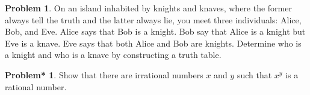 \documentclass[12pt,english]{amsart}
\theoremstyle{plain}
\theoremstyle{definition}
\theoremstyle{plain}
\theoremstyle{plain}
\theoremstyle{remark}
\newcounter{problems}
\theoremstyle{definition}
\newtheorem{problem}[problems]{Problem}
\newtheorem{bproblem}[problems]{ Problem*}
\theoremstyle{remark}
\newtheorem*{solution}{Solution}
\begin{document}
\begin{problem}
	On an island inhabited by knights and knaves, where the former always tell the truth and the latter always lie, you meet three individuals: Alice, Bob, and Eve. Alice says that Bob is a knight. Bob say that Alice is a knight but Eve is a knave. Eve says that both Alice and Bob are knights. Determine who is a knight and who is a knave by constructing a truth table.
\end{problem}

	


	 

\begin{bproblem}
Show that there are irrational numbers $x$ and $y$ 
such that 
$x^y$ is a rational number. 
\end{bproblem}


%	
\end{document}
